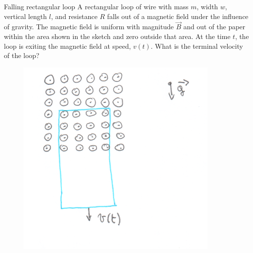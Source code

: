\documentclass[makesolutionspdf]{esg8022pset}
\begin{document}
\begin{problem}{Falling rectangular loop}
  A rectangular loop of wire with mass $m$, width $w$, vertical length $l$, and
  resistance $R$ falls out of a magnetic field under the influence of gravity.
  The magnetic field is uniform with magnitude $\vec{B}$ and out of the paper
  within the area shown in the sketch and zero outside that area. At the time
  $t$, the loop is exiting the magnetic field at speed, $v(t)$. What is the
  terminal velocity of the loop?

  \begin{figure}[H]
    \centering
    \includegraphics[width = 10cm]{fall}
    \label{fig:fall}
  \end{figure}
\end{problem}
\end{document}
